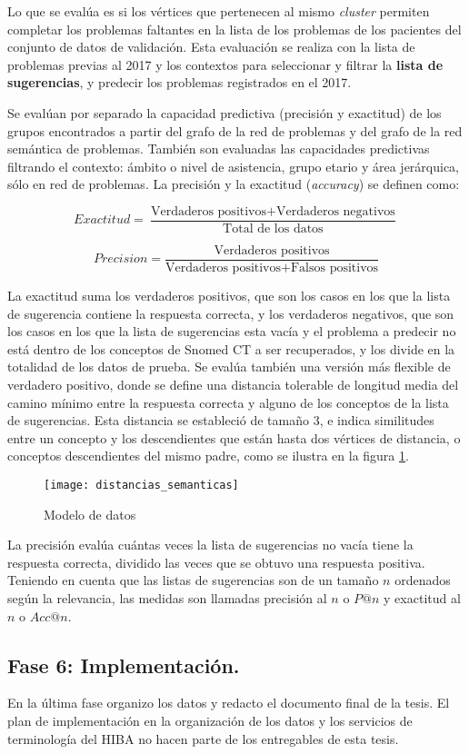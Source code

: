 \begin{itemize}
Lo que se evalúa es si los vértices que pertenecen al mismo \textit{cluster} permiten completar los problemas faltantes en la lista de los problemas de los pacientes del conjunto de datos de validación. Esta evaluación se realiza con la lista de problemas previas al 2017 y los contextos para seleccionar y filtrar la  \textbf{lista de sugerencias}, y predecir los problemas registrados en el 2017.

Se evalúan por separado la capacidad predictiva (precisión y exactitud) de los grupos encontrados a partir del grafo de la red de problemas y del grafo de la red semántica de problemas. También son evaluadas las capacidades predictivas filtrando el contexto: ámbito o nivel de asistencia, grupo etario y área jerárquica, sólo en red de problemas. La precisión y la exactitud (\textit{accuracy}) se definen como:

\begin{equation}
Exactitud = \frac{\text{Verdaderos positivos}+\text{Verdaderos negativos}}{\text{Total de los datos}}
\end{equation}

\begin{equation}
Precision = \frac{\text{Verdaderos positivos}}{\text{Verdaderos positivos}+\text{Falsos positivos}}
\end{equation}

La exactitud suma los verdaderos positivos, que son los casos en los que la lista de sugerencia contiene la respuesta correcta, y los verdaderos negativos, que son los casos en los que la lista de sugerencias esta vacía y el problema a predecir no está dentro de los conceptos de Snomed CT a ser recuperados, y los divide en la totalidad de los datos de prueba. Se evalúa también una versión más flexible de verdadero positivo, donde se define una distancia tolerable de longitud media del camino mínimo entre la respuesta correcta y alguno de los conceptos de la lista de sugerencias. Esta distancia se estableció de tamaño 3, e indica similitudes entre un concepto y los descendientes que están hasta dos vértices de distancia, o conceptos descendientes del mismo padre, como se ilustra en la figura \ref{fig:distancias_semanticas}.

\begin{figure}[ht]
\caption{Modelo de datos}
\label{fig:distancias_semanticas}
\centering
\texttt{[image: distancias\_semanticas]}
\end{figure}
 
La precisión evalúa cuántas veces la lista de sugerencias no vacía tiene la respuesta correcta, dividido las veces que se obtuvo una respuesta positiva. Teniendo en cuenta que las listas de sugerencias son de un tamaño $n$ ordenados según la relevancia, las medidas son llamadas precisión al $n$ o $P@n$ y exactitud al $n$ o $Acc@n$.

 \end{itemize}
 
\subsection{Fase 6: Implementación.} En la última fase organizo los datos y redacto el documento final de la tesis. El plan de implementación en la organización de los datos y los servicios de terminología del \acrshort{HIBA} no hacen parte de los entregables de esta tesis.





